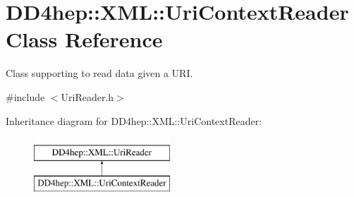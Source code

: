 \hypertarget{class_d_d4hep_1_1_x_m_l_1_1_uri_context_reader}{}\section{D\+D4hep\+:\+:X\+ML\+:\+:Uri\+Context\+Reader Class Reference}
\label{class_d_d4hep_1_1_x_m_l_1_1_uri_context_reader}


Class supporting to read data given a U\+RI.  




{\ttfamily \#include $<$Uri\+Reader.\+h$>$}

Inheritance diagram for D\+D4hep\+:\+:X\+ML\+:\+:Uri\+Context\+Reader\+:\begin{figure}[H]
\begin{center}
\leavevmode
\includegraphics[height=2.000000cm]{class_d_d4hep_1_1_x_m_l_1_1_uri_context_reader}
\end{center}
\end{figure}
